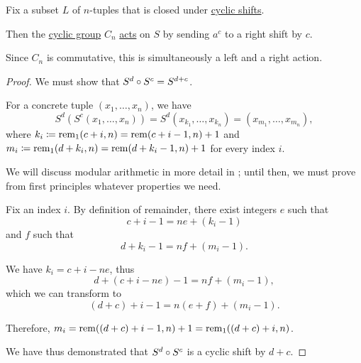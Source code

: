 \begin{proposition}\label{thm:cyclic_shift_is_action}
  Fix a subset \( L \) of \( n \)-tuples that is closed under \hyperref[def:cyclic_shift]{cyclic shifts}.

  Then the \hyperref[def:cyclic_group]{cyclic group} \( C_n \) \hyperref[def:group_action]{acts} on \( S \) by sending \( a^c \) to a right shift by \( c \).
\end{proposition}
\begin{comments}
  \item Since \( C_n \) is commutative, this is simultaneously a left and a right action.
\end{comments}
\begin{proof}
  We must show that \( S^d \bincirc S^c = S^{d + c} \).

  For a concrete tuple \( (x_1, \ldots, x_n) \), we have
  \begin{equation*}
    S^d(S^c(x_1, \ldots, x_n)) = S^d(x_{k_1}, \ldots, x_{k_n}) = (x_{m_1}, \ldots, x_{m_n}),
  \end{equation*}
  where \( k_i \coloneqq \operatorname{rem}_1(c + i, n) = \operatorname{rem}(c + i - 1, n) + 1 \) and \( m_i \coloneqq \operatorname{rem}_1(d + k_i, n) = \operatorname{rem}(d + k_i - 1, n) + 1 \) for every index \( i \).

  We will discuss modular arithmetic in more detail in ; until then, we must prove from first principles whatever properties we need.

  Fix an index \( i \). By definition of remainder, there exist integers \( e \) such that
  \begin{equation*}
    c + i - 1 = ne + (k_i - 1)
  \end{equation*}
  and \( f \) such that
  \begin{equation*}
    d + k_i - 1 = nf + (m_i - 1).
  \end{equation*}

  We have \( k_i = c + i - ne \), thus
  \begin{equation*}
    d + (c + i - ne) - 1 = nf + (m_i - 1),
  \end{equation*}
  which we can transform to
  \begin{equation*}
    (d + c) + i - 1 = n(e + f) + (m_i - 1).
  \end{equation*}

  Therefore, \( m_i = \operatorname{rem}((d + c) + i - 1, n) + 1 = \operatorname{rem}_1((d + c) + i, n) \).

  We have thus demonstrated that \( S^d \bincirc S^c \) is a cyclic shift by \( d + c \).
\end{proof}

